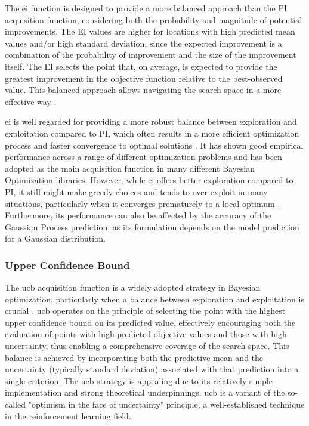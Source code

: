 The \ac{ei} function is designed to provide a more balanced approach than the \ac{PI} acquisition function, considering both the probability and magnitude of potential improvements. The EI values are higher for locations with high predicted mean values and/or high standard deviation, since the expected improvement is a combination of the probability of improvement and the size of the improvement itself. The EI selects the point that, on average, is expected to provide the greatest improvement in the objective function relative to the best-observed value. This balanced approach allows navigating the search space in a more effective way \citep{shahriari2015taking}.

\ac{ei} is well regarded for providing a more robust balance between exploration and exploitation compared to \ac{PI}, which often results in a more efficient optimization process and faster convergence to optimal solutions \citep{frazier2018tutorial}. It has shown good empirical performance across a range of different optimization problems and has been adopted as the main acquisition function in many different Bayesian Optimization libraries. 
However, while \ac{ei} offers better exploration compared to \ac{PI}, it still might make greedy choices and tends to over-exploit in many situations, particularly when it converges prematurely to a local optimum \citep{berk2019exploration}. Furthermore, its performance can also be affected by the accuracy of the Gaussian Process prediction, as its formulation depends on the model prediction for a Gaussian distribution.

\subsubsection{Upper Confidence Bound}
\label{section:ucb}

The \acf{ucb} acquisition function is a widely adopted strategy in Bayesian optimization, particularly when a balance between exploration and exploitation is crucial \citep{auer2002finite, srinivas2009gaussian}. \ac{ucb} operates on the principle of selecting the point with the highest upper confidence bound on its predicted value, effectively encouraging both the evaluation of points with high predicted objective values and those with high uncertainty, thus enabling a comprehensive coverage of the search space. This balance is achieved by incorporating both the predictive mean and the uncertainty (typically standard deviation) associated with that prediction into a single criterion. The \ac{ucb} strategy is appealing due to its relatively simple implementation and strong theoretical underpinnings. \ac{ucb} is a variant of the so-called "optimism in the face of uncertainty" principle, a well-established technique in the reinforcement learning field.

